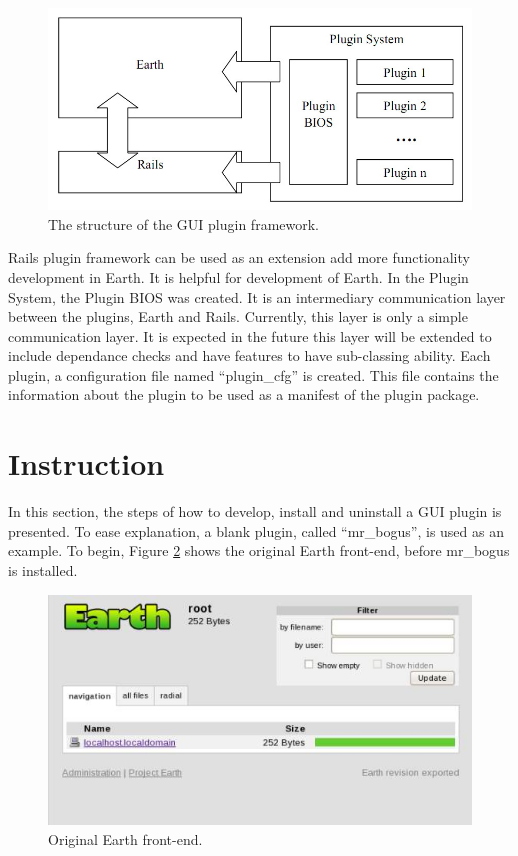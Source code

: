 \documentclass{article}
\begin{document}
\begin{figure}[ht]
    \centering
    \includegraphics[scale=0.5]{fig/flow.jpg}
    \caption{The structure of the GUI plugin framework.}
    \label{fig:flow}
\end{figure}

Rails plugin framework can be used as an extension add more functionality development in Earth. It is helpful for development of Earth. In the  Plugin System, the Plugin BIOS was created. It is an intermediary communication layer between the plugins, Earth and Rails. Currently, this layer is only a simple communication layer. It is expected in the future this layer will be extended to include dependance checks and have features to have sub-classing ability. Each plugin, a configuration file named ``plugin\_cfg'' is created. This file contains the information about the plugin to be used as a manifest of the plugin package. 


\section{Instruction} %

In this section, the steps of how to develop, install and uninstall a GUI plugin is presented. To ease explanation, a blank plugin, called ``mr\_bogus'', is used as an example. To begin, Figure \ref{fig:instruction-1} shows the original Earth front-end, before mr\_bogus is installed. 

\begin{figure}
    \centering
    \includegraphics[scale=0.7]{fig/instruction-1.jpg}
    \caption{Original Earth front-end.}
    \label{fig:instruction-1}
\end{figure}
\end{document}
